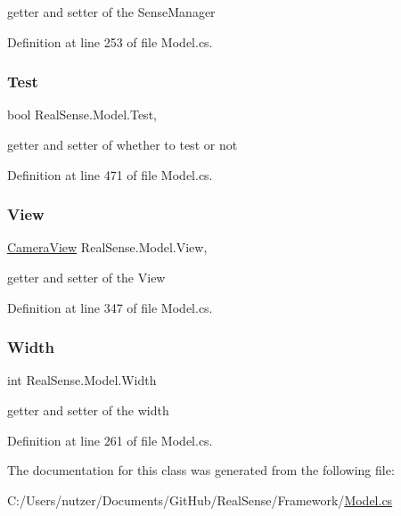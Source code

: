 getter and setter of the Sense\+Manager 

Definition at line 253 of file Model.\+cs.

\mbox{\label{class_real_sense_1_1_model_a89f4614b0f880fb6553ebcea3d2e6a6c}} 
\subsubsection{\texorpdfstring{Test}{Test}}
{\footnotesize\ttfamily bool Real\+Sense.\+Model.\+Test\hspace{0.3cm}{\ttfamily [get]}, {\ttfamily [set]}}

getter and setter of whether to test or not 

Definition at line 471 of file Model.\+cs.

\mbox{\label{class_real_sense_1_1_model_ad06548f5b1e3b3bfeaca2635d2b24fc6}} 
\subsubsection{\texorpdfstring{View}{View}}
{\footnotesize\ttfamily \hyperlink{class_real_sense_1_1_camera_view}{Camera\+View} Real\+Sense.\+Model.\+View\hspace{0.3cm}{\ttfamily [get]}, {\ttfamily [set]}}

getter and setter of the View 

Definition at line 347 of file Model.\+cs.

\mbox{\label{class_real_sense_1_1_model_a20e2b5bc79da762b436b75ddd28f63b7}} 
\subsubsection{\texorpdfstring{Width}{Width}}
{\footnotesize\ttfamily int Real\+Sense.\+Model.\+Width\hspace{0.3cm}{\ttfamily [get]}}

getter and setter of the width 

Definition at line 261 of file Model.\+cs.



The documentation for this class was generated from the following file\+:\begin{DoxyCompactItemize}
\item 
C\+:/\+Users/nutzer/\+Documents/\+Git\+Hub/\+Real\+Sense/\+Framework/\hyperlink{_model_8cs}{Model.\+cs}\end{DoxyCompactItemize}

